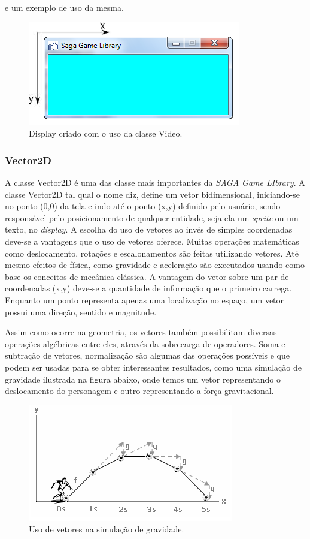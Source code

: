 %
%
e um exemplo de uso da mesma.
%
%

%
%
\begin{figure}[H]
    \centering
    \includegraphics[scale = 0.8]{Imagens/display.png}
    \caption{Display criado com o uso da classe Video.}
    \label{display}
\end{figure}
%
%
\subsubsection{Vector2D}
%
%
A classe Vector2D é uma das classe mais importantes da \textit{SAGA Game LIbrary}. A classe Vector2D tal qual o nome diz, define um vetor bidimensional, iniciando-se no ponto (0,0) da tela e indo até o ponto (x,y) definido pelo usuário, sendo responsável pelo posicionamento de qualquer entidade, seja ela um \textit{sprite} ou um texto, no \textit{display}. A escolha do uso de vetores ao invés de simples coordenadas deve-se a vantagens que o uso de vetores oferece. Muitas operações matemáticas como deslocamento, rotações e escalonamentos são feitas utilizando vetores. Até mesmo efeitos de física, como gravidade e aceleração são executados usando como base os conceitos de mecânica clássica. A vantagem do vetor sobre um par de coordenadas (x,y) deve-se a quantidade de informação que o primeiro carrega. Enquanto um ponto representa apenas uma localização no espaço, um vetor possui uma direção, sentido e magnitude. 
\par 
Assim como ocorre na geometria, os vetores também possibilitam diversas operações algébricas entre eles, através da sobrecarga de operadores. Soma e subtração de vetores, normalização são algumas das operações possíveis e que podem ser usadas para se obter interessantes resultados, como uma simulação de gravidade ilustrada na figura abaixo, onde temos um vetor representando o deslocamento do personagem e outro representando a força gravitacional.
%
%
%
\begin{figure}[H]
    \centering
    \includegraphics[scale = 0.8]{Imagens/VetorGravidade.png}
    \caption{Uso de vetores na simulação de gravidade.}
    \label{VetorGravidade}
\end{figure}
%
%
%


